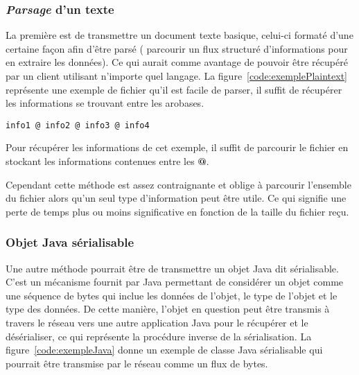 \subsubsection{{\og}\textit{Parsage}{\fg} d'un texte}

La premi\`ere est de transmettre un document texte basique, celui-ci format\'e d'une certaine fa\c{c}on afin d'\^etre pars\'e ({\cad} parcourir un flux structur\'e d'informations pour en extraire les donn\'ees).
Ce qui aurait comme avantage de pouvoir \^etre r\'ecup\'er\'e par un client utilisant n'importe quel langage.
La figure~\ref{code:exemplePlaintext} repr\'esente une exemple de fichier qu'il est facile de parser, il suffit de r\'ecup\'erer les informations se trouvant entre les arobases.

\vspace{0.20cm}

\begin{lstlisting}[language=plaintext]
info1 @ info2 @ info3 @ info4
\end{lstlisting}
\label{code:exemplePlaintext}

Pour r\'ecup\'erer les informations de cet exemple, il suffit de parcourir le fichier en stockant les informations contenues entre les \textbf{@}.

Cependant cette m\'ethode est assez contraignante et oblige \`a parcourir l'ensemble du fichier alors qu'un seul type d'information peut \^etre utile.
Ce qui signifie une perte de temps plus ou moins significative en fonction de la taille du fichier re\c{c}u.

\subsubsection{Objet Java s\'erialisable}

Une autre m\'ethode pourrait \^etre de transmettre un objet Java dit s\'erialisable.
C'est un m\'ecanisme fournit par Java permettant de consid\'erer un objet comme une s\'equence de bytes qui inclue les donn\'ees de l'objet, le type de l'objet et le type des donn\'ees.
De cette mani\`ere, l'objet en question peut \^etre transmis \`a travers le r\'eseau vers une autre application Java pour le r\'ecup\'erer et le d\'es\'erialiser, ce qui repr\'esente la proc\'edure inverse de la s\'erialisation.
La figure~\ref{code:exempleJava} donne un exemple de classe Java s\'erialisable qui pourrait \^etre transmise par le r\'eseau comme un flux de bytes.

